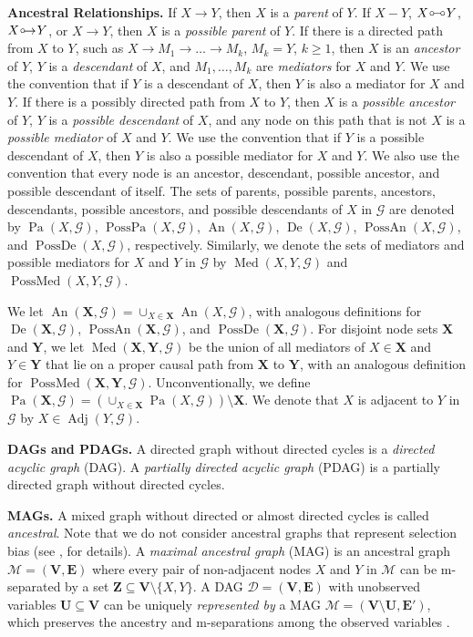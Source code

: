\documentclass[twoside]{article}
\DeclareMathOperator{\An}{An}
\DeclareMathOperator{\Pa}{Pa}
\DeclareMathOperator{\De}{De}
\DeclareMathOperator{\PossDe}{PossDe}
\DeclareMathOperator{\PossPa}{PossPa}
\DeclareMathOperator{\PossAn}{PossAn}
\DeclareMathOperator{\Adj}{Adj}
\DeclareMathOperator{\Mediators}{Med}
\newcommand{\mediatb}[2][X,Y]{\Mediators(\mb{#1},#2)}
\newcommand{\mediat}[2][X,Y]{\Mediators({#1},#2)}
\DeclareMathOperator{\PossMediators}{PossMed}
\newcommand{\possmediatb}[2][X,Y]{\PossMediators(\mb{#1},#2)}
\newcommand{\possmediat}[2][X,Y]{\PossMediators({#1},#2)}
\newcommand{\mb}[1]{\mathbf{#1}}
\newcommand{\g}[1][G]{\mathcal{#1}}
\newcommand{\circarrow}{
  \setlength{\unitlength}{1mm}
  \begin{picture}(5,1)(0,0)
    \put(1,1){\circle{1}}
    \put(1.2,0){$\rightarrow$}
  \end{picture}
}
\newcommand{\circcirc}{
  \setlength{\unitlength}{1mm}
  \begin{picture}(5,1)(0,0)
    \put(1,1){\circle{1}}
    \put(1.5,1){\line(1,0){2}}
    \put(4,1){\circle{1}}
  \end{picture}
}
\begin{document}
\textbf{Ancestral Relationships.}
If $X \to Y$, then $X$ is a \textit{parent} of $Y$. If $X-Y$, $X \circcirc Y$, $X \circarrow Y$, or $X \to Y$, then $X$ is a \textit{possible parent} of $Y$. If there is a directed path from $X$ to $Y$, such as  $X \to M_1 \to \dots \to M_k$, $M_k = Y$, $k \ge 1$, then $X$ is an \textit{ancestor} of $Y$, $Y$ is a \textit{descendant} of $X$, and $M_1, \dots, M_k$ are \textit{mediators} for $X$ and $Y$.  We use the convention that if $Y$ is a descendant of $X$, then $Y$ is also a mediator for $X$ and $Y$. If there is a possibly directed path from $X$ to $Y$, then $X$ is a \textit{possible ancestor} of $Y$, $Y$ is a \textit{possible descendant} of $X$, and any node on this path that is not $X$ is a \textit{possible mediator} of $X$ and $Y$. We use the convention that if $Y$ is a possible descendant of $X$, then $Y$ is also a possible mediator for $X$ and $Y$. We also use the convention that every node is an ancestor, descendant, possible ancestor, and possible descendant of itself. The sets of parents, possible parents, ancestors, descendants, possible ancestors, and possible descendants of $X$ in $\g$ are denoted by $\Pa(X,\g)$, $\PossPa(X,\g)$, $\An(X,\g)$, $\De(X,\g)$, $\PossAn(X,\g)$, and $\PossDe(X,\g)$, respectively. Similarly, we denote the sets of mediators and possible mediators for $X$ and $Y$ in $\g$ by $\mediat{\g}$ and $\possmediat{\g}$. 

We let $\An(\mb{X},\g) = \cup_{X \in \mb{X}} \An(X,\g)$, with analogous definitions for $\De(\mb{X},\g)$, $\PossAn(\mb{X},\g)$, and $\PossDe(\mb{X},\g)$. For disjoint node sets $\mb{X}$ and $\mb{Y}$, we let $\mediatb{\g}$ be the union of all mediators of $X \in \mb{X}$ and $Y \in \mb{Y}$ that lie on a proper causal path from $\mb{X}$ to $\mb{Y}$, with an analogous definition for $\possmediatb{\g}$. Unconventionally, we define $\Pa(\mb{X},\g) =(\cup_{X \in \mb{X}} \Pa(X,\g)) \setminus \mb{X}$. We denote that $X$ is adjacent to $Y$ in $\g$ by $X \in \Adj(Y,\g)$.

\textbf{DAGs and PDAGs.}
A directed graph without directed cycles is a \textit{directed acyclic graph} (DAG). A \textit{partially directed acyclic graph} (PDAG) is a partially directed graph without directed cycles.

\textbf{MAGs.}
A mixed graph without directed or almost directed cycles is called \textit{ancestral}. Note that we do not consider ancestral graphs that represent selection bias (see \citealp{zhang2008causal}, for details). A \textit{maximal ancestral graph} (MAG) is an ancestral graph $\g[M] = (\mb{V,E})$ where every pair of non-adjacent nodes $X$ and $Y$ in $\g[M]$ can be m-separated by a set $\mb{Z} \subseteq \mb{V} \setminus \{X,Y\}$. A DAG $\g[D] = (\mb{V,E})$ with unobserved variables $\mb{U} \subseteq \mb{V}$ can be uniquely \textit{represented by} a MAG $\g[M] = (\mb{V} \setminus \mb{U}, \mb{E'})$, which preserves the ancestry and m-separations among the observed variables \citep{richardson2002ancestral}.
\end{document}
